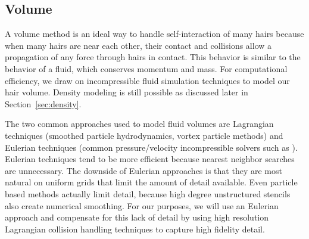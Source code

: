 \vspace{-5pt}
\subsection{Volume}
\vspace{-5pt}
\label{sec:volume}

A volume method is an ideal way to handle self-interaction of many hairs because
when many hairs are near each other, their contact and collisions allow a
propagation of any force through hairs in contact.  This behavior is similar to
the behavior of a fluid, which conserves momentum and mass. For
computational efficiency, we draw on incompressible fluid simulation
techniques to model our hair volume.  Density modeling is still
possible as discussed later in Section~\ref{sec:density}.


The two common approaches used to model fluid volumes are Lagrangian
techniques (smoothed particle hydrodynamics, vortex particle methods)
and Eulerian techniques (common pressure/velocity incompressible
solvers such as \cite{Stam:1999:SF}). Eulerian techniques tend to be more efficient because nearest neighbor
searches are unnecessary.  The downside of Eulerian approaches is that
they are most natural on uniform grids that limit the amount of detail
available. Even particle based methods actually limit detail, because high
degree unstructured stencils also create numerical smoothing. For our purposes,
we will use an Eulerian approach and compensate for this lack of
detail by using high resolution Lagrangian collision handling techniques to
capture high fidelity detail.

